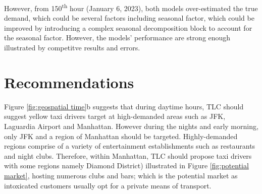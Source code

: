 \documentclass[11pt]{article}
\begin{document}
However, from 150\textsuperscript{th} hour (January 6, 2023), both models over-estimated the true demand, which could be several factors including seasonal factor, which could be improved by introducing a complex seasonal decomposition block to account for the seasonal factor. However, the models' performance are strong enough illustrated by competitve results and errors.


\section{Recommendations}
Figure \ref{fig:geospatial time}b suggests that during daytime hours, TLC should suggest yellow taxi drivers target at high-demanded areas such as JFK, Laguardia Airport and Manhattan. However during the nights and early morning, only JFK and a region of Manhattan should be targeted. Highly-demanded regions comprise of a variety of entertainment establishments such as restaurants and night clubs. Therefore, within Manhattan, TLC should propose taxi drivers with some regions namely Diamond District) illustrated in Figure \ref{fig:potential market}, hosting numerous clubs and bars; which is the potential market as intoxicated customers usually opt for a private means of transport.
\end{document}
